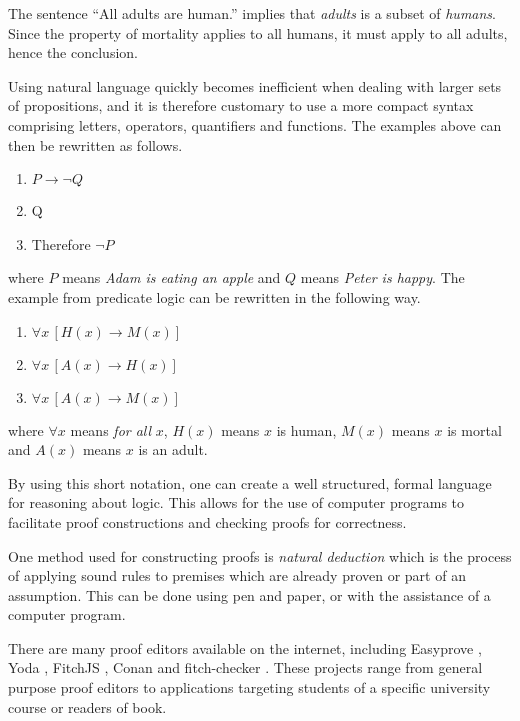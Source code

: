 The sentence ``All adults are human.'' implies that \textit{adults} is a subset of \textit{humans}. Since the property of mortality applies to all humans, it must apply to all adults, hence the conclusion.

Using natural language quickly becomes inefficient when dealing with larger sets of propositions, and it is therefore customary to use a more compact syntax comprising letters, operators, quantifiers and functions. The examples above can then be rewritten as follows.

\begin{enumerate}
      \item $P \rightarrow \lnot Q$
      \item Q
      \item Therefore $\lnot P$
\end{enumerate}

where $P$ means \textit{Adam is eating an apple} and $Q$ means \textit{Peter is happy}. The example from predicate logic can be rewritten in the following way.

\begin{enumerate}[resume]
      \item $\forall x \, [H(x) \rightarrow M(x)]$
      \item $\forall x \, [A(x) \rightarrow H(x)]$
      \item $\forall x \, [A(x) \rightarrow M(x)]$
\end{enumerate}

where $\forall x$ means \textit{for all} $x$, $H(x)$ means $x$ is human, $M(x)$ means $x$ is mortal and $A(x)$ means $x$ is an adult.

By using this short notation, one can create a well structured, formal language for reasoning about logic. This allows for the use of computer programs to facilitate proof constructions and checking proofs for correctness.

One method used for constructing proofs is \textit{natural deduction} which is the process of applying sound rules to premises which are already proven or part of an assumption. \cite{huth_ryan_2018} This can be done using pen and paper, or with the assistance of a computer program.

There are many proof editors available on the internet, including Easyprove \cite{easyprove}, Yoda \cite{Yoda}, FitchJS \cite{rieppel}, Conan \cite{conan} and fitch-checker \cite{klement}. These projects range from general purpose proof editors to applications targeting students of a specific university course or readers of book.